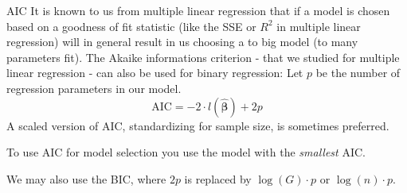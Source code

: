 \documentclass[
  ignorenonframetext,
]{beamer}
\begin{document}
\begin{frame}
\begin{block}{AIC}
\protect\hypertarget{aic}{}
It is known to us from multiple linear regression that if a model is
chosen based on a goodness of fit statistic (like the SSE or \(R^2\) in
multiple linear regression) will in general result in us choosing a to
big model (to many parameters fit). The Akaike informations criterion -
that we studied for multiple linear regression - can also be used for
binary regression: Let \(p\) be the number of regression parameters in
our model. \[\text{AIC} =-2 \cdot l(\hat{\boldsymbol{\beta}})+2p\] A
scaled version of AIC, standardizing for sample size, is sometimes
preferred.

To use AIC for model selection you use the model with the
\emph{smallest} AIC.

We may also use the BIC, where \(2p\) is replaced by \(\log(G)\cdot p\)
or \(\log(n)\cdot p\).
\end{block}
\end{frame}
\end{document}
